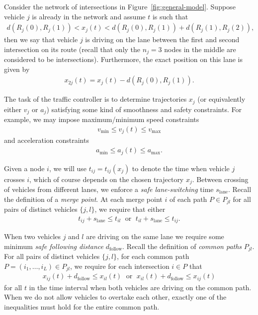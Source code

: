 \documentclass{article}
\theoremstyle{definition}
\theoremstyle{plain}
\begin{document}
\begin{eg}
  Consider the network of intersections in Figure~\ref{fig:general-model}.
  Suppose vehicle $j$ is already in the network and assume $t$ is such that
  \begin{align}
    d(R_{j}(0), R_{j}(1)) < x_{j}(t) < d(R_{j}(0), R_{j}(1)) + d(R_{j}(1), R_{j}(2)) ,
  \end{align}
  then we say that vehicle $j$ is driving on the lane between the first and
  second intersection on its route (recall that only the $n_{j}=3$ nodes in the
  middle are considered to be intersections). Furthermore, the exact position on
  this lane is given by
  \begin{align}
    x_{2j}(t) = x_{j}(t) - d(R_{j}(0), R_{j}(1)) .
  \end{align}
\end{eg}


The task of the traffic controller is to determine trajectories $x_{j}$ (or
equivalently either $v_{j}$ or $a_{j}$) satisfying some kind of smoothness and
safety constraints. For example, we may impose maximum/minimum speed constraints
\begin{align}
    v_\text{min} \leq v_j(t) \leq v_\text{max}
\end{align}
and acceleration constraints
\begin{align}
    a_\text{min} \leq a_j(t) \leq a_\text{max} .
\end{align}


Given a node $i$, we will use $t_{ij} = t_{ij}(x_{j})$ to denote the time when
vehicle $j$ crosses $i$, which of course depends on the chosen trajectory
$x_{j}$. Between crossing of vehicles from different lanes, we enforce a
\textit{safe lane-switching} time $s_{\text{lane}}$. Recall the definition of a
\textit{merge point}. At each merge point $i$ of each path $P \in P_{jl}$ for
all pairs of distinct vehicles $\{j,l\}$, we require that either
\begin{align}
  t_{ij} + s_{\text{lane}} \leq t_{il} \; \text{ or } \; t_{il} + s_{\text{lane}} \leq t_{ij} .
\end{align}

When two vehicles $j$ and $l$ are driving on the same lane we require some
minimum \textit{safe following distance} $d_{\text{follow}}$. Recall the
definition of \textit{common paths} $P_{jl}$. For all pairs of distinct vehicles
$\{j,l\}$, for each common path $P = (i_{1}, \dots, i_{L}) \in P_{jl}$, we
require for each intersection $i \in P$ that
\begin{align}
  \label{eq:following-distance-constraint}
  x_{ij}(t) + d_{\text{follow}} \leq x_{il}(t) \; \text{ or } \; x_{il}(t) + d_{\text{follow}} \leq x_{ij}(t)
\end{align}
for all $t$ in the time interval when both vehicles are driving on the common
path. When we do not allow vehicles to overtake each other, exactly one of the
inequalities must hold for the entire common path.
\end{document}
